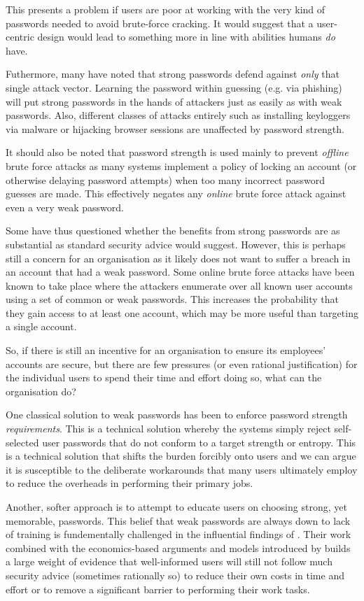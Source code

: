 \documentclass{report}
\begin{document}
This presents a problem if users are poor at working with the
very kind of passwords needed to avoid brute-force cracking. It
would suggest that a user-centric design would lead to something
more in line with abilities humans \emph{do} have.

Futhermore, many have noted that strong passwords defend
against \emph{only} that single attack vector. Learning the
password within guessing (e.g. via phishing) will put strong
passwords in the hands of attackers just as easily as with
weak passwords. Also, different classes of attacks entirely
such as installing keyloggers via malware or hijacking browser
sessions are unaffected by password strength.

It should also be noted that password strength is
used mainly to prevent
\emph{offline} brute force attacks as many systems
implement a policy of locking an account (or otherwise
delaying password attempts) when too many incorrect
password guesses are made. This effectively negates any
\emph{online} brute force attack against even a very weak
password.

Some have thus questioned whether the benefits from strong
passwords are as substantial as standard security advice
would suggest. However, this is perhaps still a concern
for an organisation as it likely does not want to suffer
a breach in an account that had a weak password. Some
online brute force attacks have been known to take place
where the attackers enumerate over all known user accounts
using a set of common or weak passwords. This increases
the probability that they gain access to at least one
account, which may be more useful than targeting a single
account.

So, if there is still an incentive for an organisation
to ensure its employees' accounts are secure, but there
are few pressures (or even rational justification)
for the individual users to spend their time and effort doing
so, what can the organisation do?

One classical solution to weak passwords
has been to enforce password strength \emph{requirements}.
This is a technical solution whereby the systems simply
reject self-selected user passwords that do not conform
to a target strength or entropy.
This is a technical solution that shifts the burden forcibly onto
users and we can argue it is susceptible to the deliberate workarounds
that many users ultimately employ to reduce the overheads
in performing their primary jobs.

Another, softer approach is to attempt to educate users
on choosing strong, yet memorable, passwords. This belief
that weak passwords are always down to lack of training
is fundementally challenged in the influential findings
of \cite{adams1999users}. Their work combined with the
economics-based arguments and models introduced by %
builds a large weight of evidence that well-informed
users will still not follow much security advice
(sometimes rationally so) to reduce their own costs in
time and effort or to remove a significant barrier
to performing their work tasks.
\end{document}
